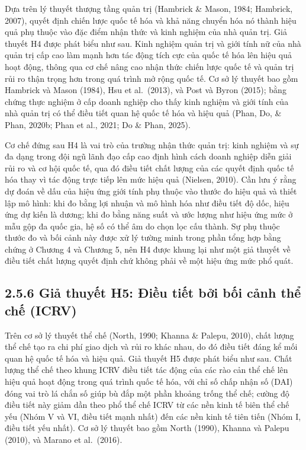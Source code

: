 \documentclass[
  a4paper,
  13pt]{extreport}
\begin{document}
Dựa trên lý thuyết thượng tầng quản trị (Hambrick \& Mason, 1984;
Hambrick, 2007), quyết định chiến lược quốc tế hóa và khả năng chuyển
hóa nó thành hiệu quả phụ thuộc vào đặc điểm nhận thức và kinh nghiệm
của nhà quản trị. Giả thuyết H4 được phát biểu như sau. Kinh nghiệm quản
trị và giới tính nữ của nhà quản trị cấp cao làm mạnh hơn tác động tích
cực của quốc tế hóa lên hiệu quả hoạt động, thông qua cơ chế nâng cao
nhận thức chiến lược quốc tế và quản trị rủi ro thận trọng hơn trong quá
trình mở rộng quốc tế. Cơ sở lý thuyết bao gồm Hambrick và Mason (1984),
Hsu et al.~(2013), và Post và Byron (2015); bằng chứng thực nghiệm ở cấp
doanh nghiệp cho thấy kinh nghiệm và giới tính của nhà quản trị có thể
điều tiết quan hệ quốc tế hóa và hiệu quả (Phan, Do, \& Phan, 2020b;
Phan et al., 2021; Do \& Phan, 2025).

Cơ chế đứng sau H4 là vai trò của trường nhận thức quản trị: kinh nghiệm
và sự đa dạng trong đội ngũ lãnh đạo cấp cao định hình cách doanh nghiệp
diễn giải rủi ro và cơ hội quốc tế, qua đó điều tiết chất lượng của các
quyết định quốc tế hóa thay vì tác động trực tiếp lên mức hiệu quả
(Nielsen, 2010). Cần lưu ý rằng dự đoán về dấu của hiệu ứng giới tính
phụ thuộc vào thước đo hiệu quả và thiết lập mô hình: khi đo bằng lợi
nhuận và mô hình hóa như điều tiết độ dốc, hiệu ứng dự kiến là dương;
khi đo bằng năng suất và ước lượng như hiệu ứng mức ở mẫu gộp đa quốc
gia, hệ số có thể âm do chọn lọc cấu thành. Sự phụ thuộc thước đo và bối
cảnh này được xử lý tường minh trong phần tổng hợp bằng chứng ở Chương 4
và Chương 5, nên H4 được khung lại như một giả thuyết về điều tiết chất
lượng quyết định chứ không phải về một hiệu ứng mức phổ quát.

\hypertarget{giux1ea3-thuyux1ebft-h5-ux111iux1ec1u-tiux1ebft-bux1edfi-bux1ed1i-cux1ea3nh-thux1ec3-chux1ebf-icrv}{%
\subsection{2.5.6 Giả thuyết H5: Điều tiết bởi bối cảnh thể chế
(ICRV)}\label{giux1ea3-thuyux1ebft-h5-ux111iux1ec1u-tiux1ebft-bux1edfi-bux1ed1i-cux1ea3nh-thux1ec3-chux1ebf-icrv}}

Trên cơ sở lý thuyết thể chế (North, 1990; Khanna \& Palepu, 2010), chất
lượng thể chế tạo ra chi phí giao dịch và rủi ro khác nhau, do đó điều
tiết đáng kể mối quan hệ quốc tế hóa và hiệu quả. Giả thuyết H5 được
phát biểu như sau. Chất lượng thể chế theo khung ICRV điều tiết tác động
của các rào cản thể chế lên hiệu quả hoạt động trong quá trình quốc tế
hóa, với chỉ số chấp nhận số (DAI) đóng vai trò lá chắn số giúp bù đắp
một phần khoảng trống thể chế; cường độ điều tiết này giảm dần theo phổ
thể chế ICRV từ các nền kinh tế biên thể chế yếu (Nhóm V và VI, điều
tiết mạnh nhất) đến các nền kinh tế tiên tiến (Nhóm I, điều tiết yếu
nhất). Cơ sở lý thuyết bao gồm North (1990), Khanna và Palepu (2010), và
Marano et al.~(2016).
\end{document}
